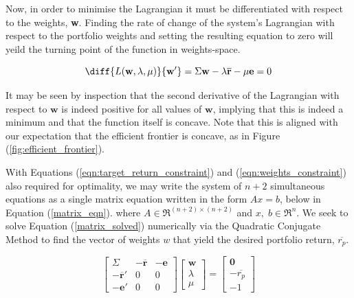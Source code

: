 \documentclass{article}
\begin{document}
Now, in order to minimise the Lagrangian it must be differentiated with respect to the weights, {\textbf{w}}. Finding the rate of change of the system's Lagrangian with respect to the portfolio weights and setting the resulting equation to zero will yeild the turning point of the function in weights-space.

\begin{equation}
\diff{L(\textbf{w}, \lambda, \mu)}{\textbf{w}'} =  \Sigma\textbf{w}
-\lambda \overline{\textbf{r}}
-\mu\textbf{e} = 0
\label{eqn:optimality_lagrangian}
\end{equation}

It may be seen by inspection that the second derivative of the Lagrangian with respect to $\textbf{w}$  is indeed positive for all values of $\textbf{w}$, implying that this is indeed a minimum and that the function itself is concave. Note that this is aligned with our expectation that the efficient frontier is concave, as in Figure (\ref{fig:efficient_frontier}).

With Equations (\ref{eqn:target_return_constraint}) and (\ref{eqn:weights_constraint}) also required for optimality, we may write the system of $n+2$ simultaneous equations as a single matrix equation written in the form $Ax = b$, below in Equation (\ref{matrix_eqn}). where $A \in \Re^{(n+2) \times (n+2)}$ and $x,\; b \in \Re^n$. We seek to solve Equation (\ref{matrix_solved}) numerically via the Quadratic Conjugate Method to find the vector of weights $w$ that yield the desired portfolio return, $\overline{r_p}$.

\begin{equation}
\begin{bmatrix}
\Sigma & -\overline{\textbf{r}} & -\textbf{e} \\
-\overline{\textbf{r}}'  & 0 & 0 \\
-\textbf{e}' & 0 & 0 
\end{bmatrix}
\begin{bmatrix}
\textbf{w}\\
\lambda \\
\mu
\end{bmatrix}
=
\begin{bmatrix}
\textbf{0}\\
-\overline{r_p}\\
-1
\end{bmatrix}
\label{matrix_eqn}
\end{equation}
\end{document}
